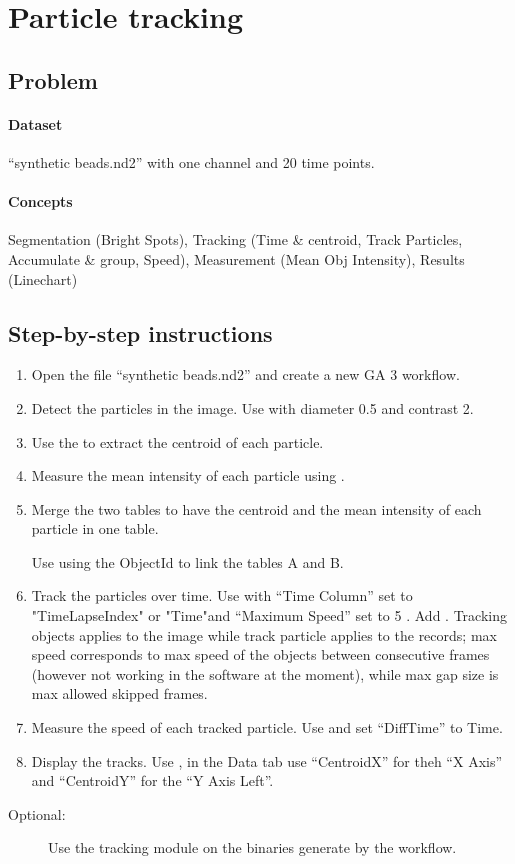 \section{Particle tracking}

\subsection{Problem}

\paragraph{Dataset} ``synthetic beads.nd2'' with one channel and 20 time points.

\paragraph{Concepts} Segmentation (Bright Spots), Tracking (Time \& centroid, Track Particles, Accumulate \& group, Speed), Measurement (Mean Obj Intensity), Results (Linechart)

\subsection{Step-by-step instructions}

\begin{enumerate}
    \item Open the file ``synthetic beads.nd2'' and create a new GA 3 workflow.
    \item Detect the particles in the image. Use  with diameter 0.5 and contrast 2. 
    \item Use the  to extract the centroid of each particle.
    \item Measure the mean intensity of each particle using .
    \item Merge the two tables to have the centroid and the mean intensity of each particle in one table. 
    
    Use  using the ObjectId to link the tables A and B. \solnend
    \item Track the particles over time. Use  with ``Time Column'' set to "TimeLapseIndex" or "Time"\soln and ``Maximum Speed'' set to 5 \solnend. Add . Tracking objects applies to the image while track particle applies to the records; max speed corresponds to max speed of the objects between consecutive frames (however not working in the software at the moment), while max gap size is max allowed skipped frames.
    \item Measure the speed of each tracked particle. \soln Use  and set ``DiffTime'' to Time. \solnend
    \item Display the tracks. Use , in the Data tab use ``CentroidX'' for theh ``X Axis'' and ``CentroidY'' for the ``Y Axis Left''.
\end{enumerate}

\begin{description}
    \item[Optional:] Use the tracking module on the binaries generate by the workflow.
\end{description}
